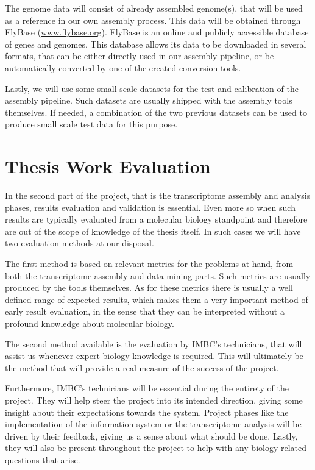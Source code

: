 The genome data will consist of already assembled \fly{} genome(s), that will be
used as a reference in our own assembly process. This data will be obtained
through FlyBase (\url{www.flybase.org}). FlyBase is an online and publicly accessible
database of \Fly{} genes and genomes. This database allows its data to be downloaded in
several formats, that can be either directly used in our assembly pipeline,
or be automatically converted by one of the created conversion tools.

Lastly, we will use some small scale datasets for the test and calibration of the
assembly pipeline. Such datasets are usually shipped with the assembly tools
themselves. If needed, a combination of the two previous datasets can be used to
produce small scale test data for this purpose.

\section{Thesis Work Evaluation}\label{sec:eval}

In the second part of the project, that is the transcriptome assembly and
analysis phases, results evaluation and validation is essential. Even more so
when such results are typically evaluated from a molecular biology standpoint and
therefore are out of the scope of knowledge of the thesis itself. In such cases
we will have two evaluation methods at our disposal.

The first method is based on relevant metrics for the problems at hand, from
both the transcriptome assembly and data mining parts. Such metrics are usually
produced by the tools themselves. As for these metrics there is usually a well
defined range of expected results, which makes them a very important method of early
result evaluation, in the sense that they can be interpreted without a profound
knowledge about molecular biology.

The second method available is the evaluation by IMBC's technicians, that will
assist us whenever expert biology knowledge is required. This will ultimately be
the method that will provide a real measure of the success of the project.

Furthermore, IMBC's technicians will be essential during the entirety of the project. They
will help steer the project into its intended direction, giving some insight
about their expectations towards the system. Project phases like the
implementation of the information system or the transcriptome analysis will be
driven by their feedback, giving us a sense about what should be done. Lastly,
they will also be present throughout the project to help with any biology
related questions that arise.
